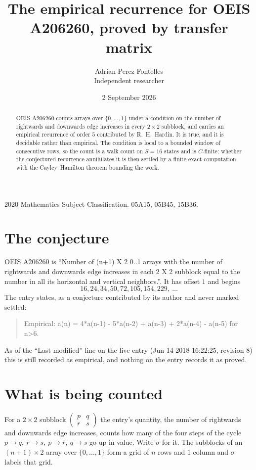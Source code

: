 \documentclass[11pt,a4paper]{article}
\title{The empirical recurrence for OEIS A206260, proved by transfer matrix}
\author{Adrian Perez Fontelles\\ \small Independent researcher}
\date{2 September 2026}
\theoremstyle{plain}
\theoremstyle{definition}
\begin{document}
\maketitle

\begin{abstract}
OEIS A206260 counts arrays over $\{0,\dots,1\}$ under a condition on the number of rightwards and downwards edge increases
in every $2\times2$ subblock, and carries an empirical recurrence of order $5$ contributed by
R.~H.~Hardin. It is true, and it is decidable rather than empirical. The condition is local to
a bounded window of consecutive rows, so the count is a walk count on $S=16$ states and is
$C$-finite; whether the conjectured recurrence annihilates it is then settled by a finite exact
computation, with the Cayley--Hamilton theorem bounding the work.
\end{abstract}

\noindent\small 2020 Mathematics Subject Classification. 05A15, 05B45, 15B36.\normalsize

\section{The conjecture}

OEIS A206260 is ``Number of (n+1) X 2 0..1 arrays with the number of rightwards and downwards edge increases in each 2 X 2 subblock equal to the number in all its horizontal and vertical neighbors.''. It has offset $1$ and begins
\[
16, 24, 34, 50, 72, 105, 154, 229,\ \dots
\]
The entry states, as a conjecture contributed by its author and never marked settled:
\begin{quote}
Empirical: a(n) = 4*a(n-1) - 5*a(n-2) + a(n-3) + 2*a(n-4) - a(n-5) for n>6.
\end{quote}
As of the ``Last modified'' line on the live entry (Jun 14 2018 16:22:25, revision 8) this is still
recorded as empirical, and nothing on the entry records it as proved.

\section{What is being counted}

For a $2\times2$ subblock $\begin{pmatrix}p&q\\r&s\end{pmatrix}$ the
entry's quantity, the number of rightwards and downwards edge increases, counts how many of the four steps of the cycle $p\to q,\ r\to s,\ p\to r,\ q\to s$ go up in value. Write $\sigma$ for it. The subblocks of an
$(n+1)\times2$ array over $\{0,\dots,1\}$ form a grid of $n$ rows and $1$
column and $\sigma$ labels that grid.
\end{document}
